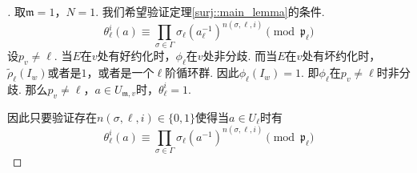\begin{proof}[]
    取$\mathfrak{m}=1$，$N=1$. 我们希望验证定理\ref{surj::main_lemma}的条件.
    \begin{equation}
        \theta_{\ell}^i (a) \equiv \prod_{\sigma\in \Gamma} \sigma_{\ell}(a_{\ell}^{-1})^{n(\sigma, \ell,i)}
        \pmod{\mathfrak{p}_{\ell}}
    \end{equation}
    设$p_v\neq \ell$. 当$E$在$v$处有好约化时，$\phi_{\ell}$在$v$处非分歧.
    而当$E$在$v$处有坏约化时，$\tilde{\rho}_{\ell}(I_w)$或者是$1$，或者是一个$\ell$阶循环群.
    因此$\phi_{\ell}(I_w)=1$. 即$\phi_{\ell}$在$p_v\neq \ell$时非分歧.
    那么$p_v\neq \ell$，$a\in U_{\mathfrak{m}, v}$时，$\theta_{\ell}^{i} = 1$.

    因此只要验证存在$n(\sigma, \ell,i)\in \{0, 1\}$使得当$a\in U_{\ell}$时有
    \begin{equation}
        \theta_{\ell}^i (a) \equiv \prod_{\sigma\in \Gamma} \sigma_{\ell}(a^{-1})^{n(\sigma, \ell,i)}
        \pmod{\mathfrak{p}_{\ell}}
    \end{equation}

\end{proof}
